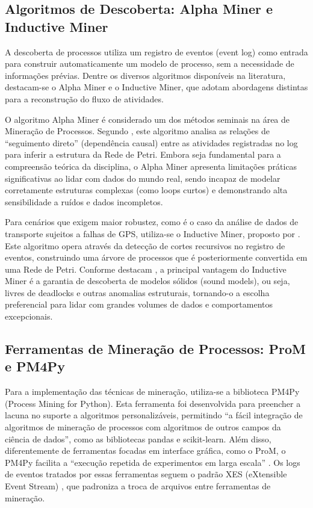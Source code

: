 \subsection{Algoritmos de Descoberta: Alpha Miner e Inductive Miner}\label{subsec:algoritmosDescoberta}

A descoberta de processos utiliza um registro de eventos (event log) como entrada para construir automaticamente um modelo de processo, sem a necessidade de informações prévias. Dentre os diversos algoritmos disponíveis na literatura, destacam-se o Alpha Miner e o Inductive Miner, que adotam abordagens distintas para a reconstrução do fluxo de atividades.

O algoritmo Alpha Miner é considerado um dos métodos seminais na área de Mineração de Processos. Segundo , este algoritmo analisa as relações de ``seguimento direto'' (dependência causal) entre as atividades registradas no log para inferir a estrutura da Rede de Petri. Embora seja fundamental para a compreensão teórica da disciplina, o Alpha Miner apresenta limitações práticas significativas ao lidar com dados do mundo real, sendo incapaz de modelar corretamente estruturas complexas (como loops curtos) e demonstrando alta sensibilidade a ruídos e dados incompletos.

Para cenários que exigem maior robustez, como é o caso da análise de dados de transporte sujeitos a falhas de GPS, utiliza-se o Inductive Miner, proposto por . Este algoritmo opera através da detecção de cortes recursivos no registro de eventos, construindo uma árvore de processos que é posteriormente convertida em uma Rede de Petri. Conforme destacam , a principal vantagem do Inductive Miner é a garantia de descoberta de modelos sólidos (sound models), ou seja, livres de deadlocks e outras anomalias estruturais, tornando-o a escolha preferencial para lidar com grandes volumes de dados e comportamentos excepcionais.

\subsection{Ferramentas de Mineração de Processos: ProM e PM4Py}\label{subsec:ferramentasMP}

Para a implementação das técnicas de mineração, utiliza-se a biblioteca PM4Py (Process Mining for Python). Esta ferramenta foi desenvolvida para preencher a lacuna no suporte a algoritmos personalizáveis, permitindo ``a fácil integração de algoritmos de mineração de processos com algoritmos de outros campos da ciência de dados'', como as bibliotecas pandas e scikit-learn. Além disso, diferentemente de ferramentas focadas em interface gráfica, como o ProM, o PM4Py facilita a ``execução repetida de experimentos em larga escala'' \cite{berti2019}. Os logs de eventos tratados por essas ferramentas seguem o padrão XES (eXtensible Event Stream) \cite{ieee1849}, que padroniza a troca de arquivos entre ferramentas de mineração.

